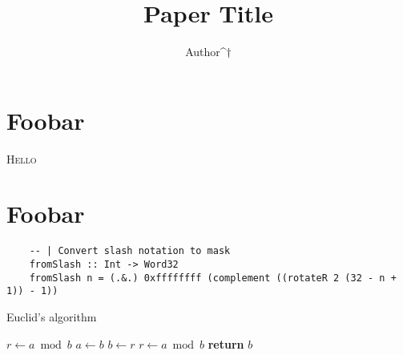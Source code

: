 \documentclass{report}%
\title{Paper Title}
\author{Author^$\dagger$}
\affil{Institution^$\dagger$}
\begin{document}
\maketitle%

\begin{abstract}
  \blindtext%
\end{abstract}

\section{Foobar}

\lettrine{H}{ello}
\Blindtext%


\blindtext%

\section{Foobar}

\begin{strip}
  \centering\noindent
  \begin{verbatim}
    -- | Convert slash notation to mask
    fromSlash :: Int -> Word32
    fromSlash n = (.&.) 0xffffffff (complement ((rotateR 2 (32 - n + 1)) - 1))
  \end{verbatim}
\end{strip}

\Blindtext%

\begin{algorithm*}
  \caption{Euclid’s algorithm}\label{euclid}
  \begin{algorithmic}[1]
      \State $r\gets a\bmod b$
        \State $a\gets b$
        \State $b\gets r$
        \State $r\gets a\bmod b$
      \EndWhile\label{euclidendwhile}
      \State \textbf{return} $b$
    \EndProcedure
  \end{algorithmic}
\end{algorithm*}

\Blindtext%
\end{document}
